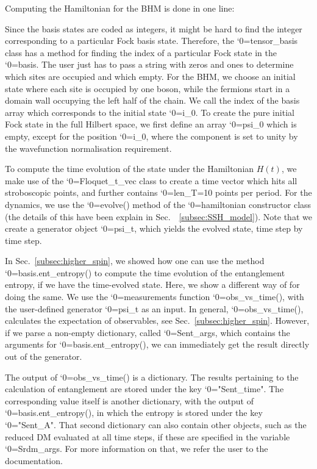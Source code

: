 \documentclass{SciPost}
\newcommand\0{\scalebox{-1}[1]{0}}
\let\svttfamily\ttfamily
\renewcommand\ttfamily{\svttfamily\catcode`0=\active }
\renewcommand\texttt{\bgroup\ttfamily\texttthelp}
\def\texttthelp#1{#1\egroup}
\newcommand{\BFMcode}{example10.py}
\begin{document}

Computing the Hamiltonian for the BHM is done in one line:
 
Since the basis states are coded as integers, it might be hard to find the integer corresponding to a particular Fock basis state. Therefore, the \texttt{tensor\_basis} class has a method for finding the index of a particular Fock state in the \texttt{basis}. The user just has to pass a string with zeros and ones to determine which sites are occupied and which empty. For the BHM, we choose an initial state where each site is occupied by one boson, while the fermions start in a domain wall occupying the left half of the chain. We call the index of the basis array which corresponds to the initial state \texttt{i\_0}. To create the pure initial Fock state in the full Hilbert space, we first define an array \texttt{psi\_0} which is empty, except for the position \texttt{i\_0}, where the component is set to unity by the wavefunction normalisation requirement.
 
To compute the time evolution of the state under the Hamiltonian $H(t)$, we make use of the \texttt{Floquet\_t\_vec} class to create a time vector which hits all stroboscopic points, and further contains \texttt{len\_T=10} points per period. For the dynamics, we use the \texttt{evolve()} method of the \texttt{hamiltonian} constructor class (the details of this have been explain in Sec.~~\ref{subsec:SSH_model}). Note that we create a generator object \texttt{psi\_t}, which yields the evolved state, time step by time step.
 
In Sec.~\ref{subsec:higher_spin}, we showed how one can use the method \texttt{basis.ent\_entropy()} to compute the time evolution of the entanglement entropy, if we have the time-evolved state. Here, we show a different way of for doing the same. We use the \texttt{measurements} function \texttt{obs\_vs\_time()}, with the user-defined generator \texttt{psi\_t} as an input. In general, \texttt{obs\_vs\_time()}, calculates the expectation of observables, see Sec.~\ref{subsec:higher_spin}. However, if we parse a non-empty dictionary, called \texttt{Sent\_args}, which contains the arguments for \texttt{basis.ent\_entropy()}, we can immediately get the result directly out of the generator. 
 
The output of \texttt{obs\_vs\_time()} is a dictionary. The results pertaining to the calculation of entanglement
are stored under the key \texttt{"Sent\_time"}. The corresponding value itself is another dictionary, with the output of \texttt{basis.ent\_entropy()}, in which the entropy is stored under the key \texttt{"Sent\_A"}. That second dictionary can also contain other objects, such as the reduced DM evaluated at all time steps, if these are specified in the variable \texttt{Srdm\_args}. For more information on that, we refer the user to the documentation.

 
\end{document}
